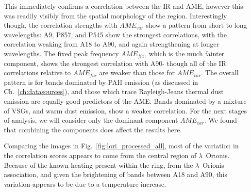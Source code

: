      This immediately confirms a correlation between the IR and AME, however this was readily visibly from the spatial morphology of the region. Interestingly though, the correlation strengths with $AME_{var}$ show a pattern from short to long wavelengths: A9, P857, and P545 show the strongest correlations, with the correlation weaking from A18 to A90, and again strengthening at longer wavelengths. The fixed peak frequency $AME_{fix}$, which is the much fainter component, shows the strongest correlation with A90- though all of the IR correlations relative to $AME_{fix}$ are weaker than those for $AME_{var}$. The overall pattern is for bands dominated by PAH emission (as discussed in Ch.~\ref{ch:datasources}), and those which trace Rayleigh-Jeans thermal dust emission are equally good predictors of the AME. Bands dominated by a mixture of VSGs, and warm dust emission, show a weaker correlation. For the next stages of analysis, we will consider only the dominant component $AME_{var}$. We found that combining the components does affect the results here.

     Comparing the images in Fig.~\ref{fig:lori_processed_all}, most of the variation in the correlation scores appears to come from the central region of $\lambda$~Orionis. Because of the known heating present within the ring, from the $\lambda$~Orionis association, and given the brightening of bands between A18 and A90, this variation appears to be due to a temperature increase.
